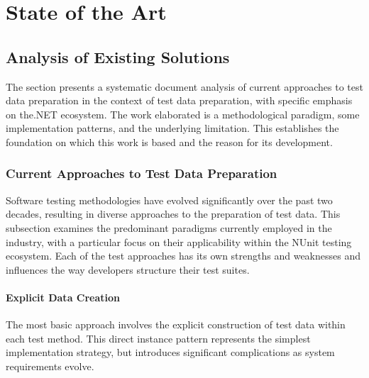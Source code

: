 
\chapter{State of the Art\label{chap:state_of_the_art}}


\section{Analysis of Existing Solutions}\label{sec:an_exist_sol}

The section presents a systematic document analysis of current approaches to test data preparation in the context of test data preparation, with specific emphasis on the.NET ecosystem. The work elaborated is a methodological paradigm, some implementation patterns, and the underlying limitation. This establishes the foundation on which this work is based and the reason for its development.

\subsection{Current Approaches to Test Data Preparation}

Software testing methodologies have evolved significantly over the past two decades, resulting in diverse approaches to the preparation of test data. This subsection examines the predominant paradigms currently employed in the industry, with a particular focus on their applicability within the NUnit testing ecosystem. Each of the test approaches has its own strengths and weaknesses and influences the way developers structure their test suites.

\subsubsection{Explicit Data Creation}
The most basic approach involves the explicit construction of test data within each test method. This direct instance pattern represents the simplest implementation strategy, but introduces significant complications as system requirements evolve.

